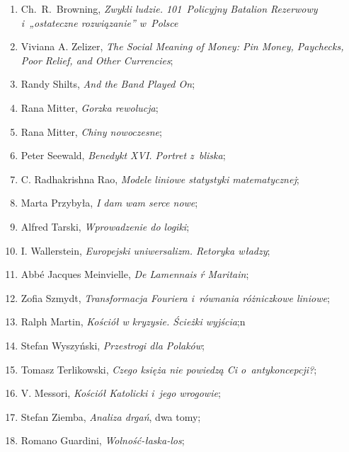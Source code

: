 \documentclass[a4paper,11pt]{article}
\begin{document}
\begin{enumerate}
\item Ch.~R.~Browning, \textit{Zwykli ludzie. 101~Policyjny Batalion
    Rezerwowy i~„ostateczne rozwiązanie” w~Polsce}

\item Viviana A. Zelizer, \textit{The Social Meaning of Money: Pin
    Money, Paychecks, Poor Relief, and Other Currencies};

\item Randy Shilts, \textit{And the Band Played On};

\item Rana Mitter, \textit{Gorzka rewolucja};

\item Rana Mitter, \textit{Chiny nowoczesne};

\item Peter Seewald, \textit{Benedykt XVI. Portret z~bliska};

\item C. Radhakrishna Rao, \textit{Modele liniowe statystyki matematycznej};

\item Marta Przybyła, \textit{I dam wam serce nowe};

\item Alfred Tarski, \textit{Wprowadzenie do logiki};

\item I. Wallerstein, \textit{Europejski uniwersalizm. Retoryka władzy};

\item Abbé Jacques Meinvielle, \textit{De Lamennais ŕ Maritain};

\item Zofia Szmydt, \textit{Transformacja Fouriera i~równania różniczkowe
    liniowe};

\item Ralph Martin, \textit{Kościół w kryzysie. Ścieżki wyjścia};n

\item Stefan Wyszyński, \textit{Przestrogi dla Polaków};

\item Tomasz Terlikowski, \textit{Czego księża nie powiedzą Ci
    o~antykoncepcji?};

\item V. Messori, \textit{Kościół Katolicki i~jego wrogowie};

\item Stefan Ziemba, \textit{Analiza drgań}, dwa tomy;

\item Romano Guardini, \textit{Wolność-łaska-los};


\end{enumerate}
\end{document}
